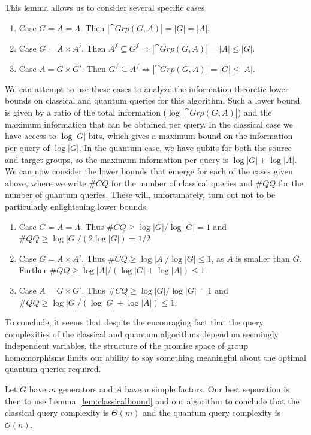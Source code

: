 This lemma allows us to consider several specific cases:
\begin{enumerate}
\item Case $G=A=\Lambda$.  Then $|\cat{Grp}(G,A)| = |G|=|A|$.
\item Case $G=A\times A'$. Then $A^f\subseteq G^f \Rightarrow |\cat{Grp}(G,A)| = |A| \le |G|$.
\item Case $A=G\times G'$. Then $G^f\subseteq A^f \Rightarrow |\cat{Grp}(G,A)| = |G| \le |A|$.
\end{enumerate}
\noindent We can attempt to use these cases to analyze the information theoretic lower bounds on classical and quantum queries for this algorithm.  Such a lower bound is given by a ratio of the total information ($\log|\cat{Grp}(G,A)|$) and the maximum information that can be obtained per query.  In the classical case we have access to $\log|G|$ bits, which gives a maximum bound on the information per query of $\log|G|$. In the quantum case, we have qubits for both the source and target groups, so the maximum information per query is $\log|G|+\log|A|$. We can now consider the lower bounds that emerge for each of the cases given above, where we write $\#CQ$ for the number of classical queries and $\#QQ$ for the number of quantum queries. These will, unfortunately, turn out not to be particularly enlightening lower bounds.
\begin{enumerate}
\item Case $G=A=\Lambda$. Thus $\#CQ\ge\log|G|/\log|G|=1$ and $\#QQ\ge\log|G|/(2\log|G|)=1/2$.
\item Case $G=A\times A'$. Thus $\#CQ\ge\log|A|/\log|G|\le1$, as $A$ is smaller than $G$. Further $\#QQ\ge\log|A|/(\log|G|+\log|A|)\le1.$
\item Case $A=G\times G'$. Thus $\#CQ\ge\log|G|/\log|G|=1$ and $\#QQ\ge\log|G|/(\log|G|+\log|A|)\le1.$
\end{enumerate}

To conclude, it seems that despite the encouraging fact that the query complexities of the classical and quantum algorithms depend on seemingly independent variables, the structure of the promise space of group homomorphisms limits our ability to say something meaningful about the optimal quantum queries required. 

Let $G$ have $m$ generators and $A$ have $n$ simple factors. Our best separation is then to use Lemma~\ref{lem:classicalbound} and our algorithm to conclude that the classical query complexity is $\Theta(m)$ and the quantum query complexity is $\mathcal{O}(n)$.

